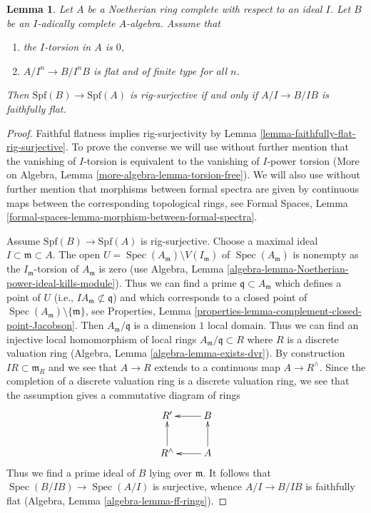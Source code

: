 \documentclass{stacks-project}
\theoremstyle{plain}
\newtheorem{lemma}[subsection]{Lemma}
\theoremstyle{definition}
\theoremstyle{remark}
\numberwithin{equation}{subsection}
\def\Spec{\mathop{\mathrm{Spec}}}
\begin{document}
\begin{lemma}
\label{lemma-flat-rig-surjective}
Let $A$ be a Noetherian ring complete with respect to an ideal $I$.
Let $B$ be an $I$-adically complete $A$-algebra. Assume that
\begin{enumerate}
\item the $I$-torsion in $A$ is $0$,
\item $A/I^n \to B/I^nB$ is flat and of finite type for all $n$.
\end{enumerate}
Then $\text{Spf}(B) \to \text{Spf}(A)$ is rig-surjective if and only
if $A/I \to B/IB$ is faithfully flat.
\end{lemma}

\begin{proof}
Faithful flatness implies rig-surjectivity by
Lemma \ref{lemma-faithfully-flat-rig-surjective}.
To prove the converse we will use without further mention that the
vanishing of $I$-torsion is equivalent to the vanishing of $I$-power torsion
(More on Algebra, Lemma \ref{more-algebra-lemma-torsion-free}).
We will also use without further mention that morphisms between
formal spectra are given by continuous maps between the corresponding
topological rings, see
Formal Spaces, Lemma \ref{formal-spaces-lemma-morphism-between-formal-spectra}.

\medskip\noindent
Assume $\text{Spf}(B) \to \text{Spf}(A)$ is rig-surjective.
Choose a maximal ideal $I \subset \mathfrak m \subset A$.
The open $U = \Spec(A_\mathfrak m) \setminus V(I_\mathfrak m)$
of $\Spec(A_\mathfrak m)$ is nonempty as the $I_\mathfrak m$-torsion of
$A_\mathfrak m$ is zero
(use Algebra, Lemma \ref{algebra-lemma-Noetherian-power-ideal-kills-module}).
Thus we can find a prime $\mathfrak q \subset A_\mathfrak m$ which defines
a point of $U$ (i.e., $IA_\mathfrak m \not \subset \mathfrak q$)
and which corresponds to a closed point
of $\Spec(A_\mathfrak m) \setminus \{\mathfrak m\}$, see
Properties, Lemma \ref{properties-lemma-complement-closed-point-Jacobson}.
Then $A_\mathfrak m/\mathfrak q$ is a dimension $1$ local domain.
Thus we can find an injective local homomorphism of local rings
$A_\mathfrak m/\mathfrak q \subset R$ where $R$ is a discrete valuation ring
(Algebra, Lemma \ref{algebra-lemma-exists-dvr}).
By construction $IR \subset \mathfrak m_R$ and we see that
$A \to R$ extends to a continuous map $A \to R^\wedge$.
Since the completion of a discrete valuation ring is a discrete
valuation ring, we see that the assumption gives a commutative
diagram of rings
$$
\xymatrix{
R' & B \ar[l] \\
R^\wedge \ar[u] & A \ar[l] \ar[u]
}
$$
Thus we find a prime ideal of $B$ lying over $\mathfrak m$. It follows
that $\Spec(B/IB) \to \Spec(A/I)$ is surjective, whence $A/I \to B/IB$
is faithfully flat
(Algebra, Lemma \ref{algebra-lemma-ff-rings}).
\end{proof}
\end{document}
